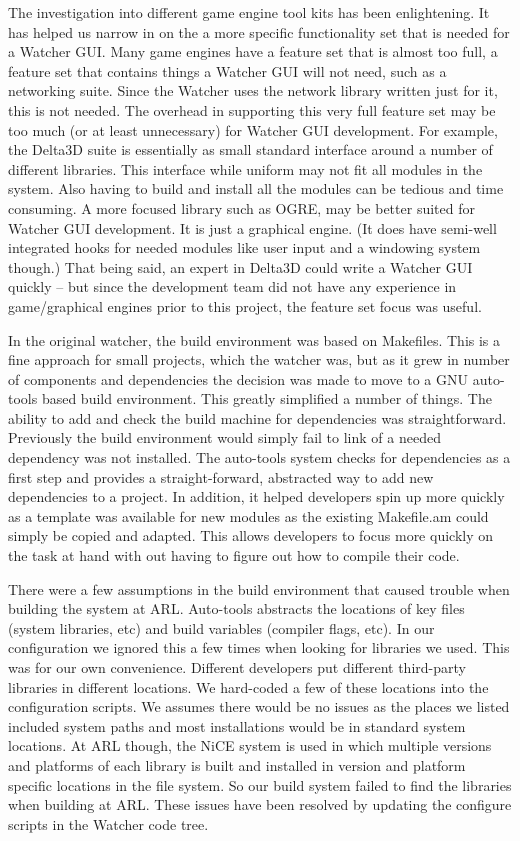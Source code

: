 \documentclass{report}
\begin{document}
The investigation into different game engine tool kits has been enlightening. It has helped us narrow in on the a more specific functionality set that is needed
for a Watcher GUI. Many game engines have a feature set that is almost too full, a feature set that contains things a Watcher GUI will not need, such as 
a networking suite. Since the Watcher uses the network library written just for it, this is not needed. The overhead in supporting this very full
feature set may be too much (or at least unnecessary) for Watcher GUI development. For example, the Delta3D suite is essentially as small standard 
interface around a number of different libraries. This interface while uniform may not fit all modules in the system. Also having to build and install
all the modules can be tedious and time consuming. A more focused library such as OGRE, may be better suited for Watcher GUI development. It is just 
a graphical engine. (It does have semi-well integrated hooks for needed modules like user input and a windowing system though.) That being said, an expert 
in Delta3D could write a Watcher GUI quickly -- but since the development team did not have any experience in game\slash graphical engines prior to 
this project, the feature set focus was useful. 

In the original watcher, the build environment was based on Makefiles. This is a fine approach for small projects, which the watcher was, but as it grew
in number of components and dependencies the decision was made to move to a GNU auto-tools based build environment. This greatly simplified a number
of things. The ability to add and check the build machine for dependencies was straightforward. Previously the build environment would simply fail to link
of a needed dependency was not installed. The auto-tools system checks for dependencies as a first step and provides a straight-forward, abstracted way 
to add new dependencies to a project. In addition, it helped developers spin up more quickly as a template was available for new modules as the existing
Makefile.am could simply be copied and adapted. This allows developers to focus more quickly on the task at hand with out having to figure out how to 
compile their code. 

There were a few assumptions in the build environment that caused trouble when building the system at ARL. Auto-tools abstracts the locations
of key files (system libraries, etc) and build variables (compiler flags, etc). In our configuration we ignored this a few times when looking 
for libraries we used. This was for our own convenience. Different developers put different third-party libraries in different locations. We hard-coded
a few of these locations into the configuration scripts. We assumes there would be no issues as the places we listed included system paths and most
installations would be in standard system locations. At ARL though, the NiCE system is used in which multiple versions and platforms of each library
is built and installed in version and platform specific locations in the file system. So our build system failed to find the libraries when building 
at ARL. These issues have been resolved by updating the configure scripts in the Watcher code tree. 
\end{document}
